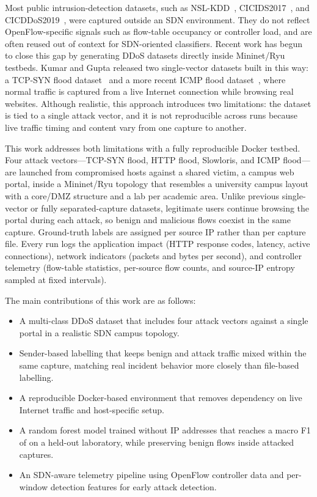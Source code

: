 \documentclass[lettersize,journal]{IEEEtran}
\begin{document}
Most public intrusion-detection datasets, such as NSL-KDD~\cite{tavallaee2009nslkdd}, CICIDS2017~\cite{sharafaldin2018cicflowmeter}, and CICDDoS2019~\cite{sharafaldin2019cicddos2019}, were captured outside an SDN environment. They do not reflect OpenFlow-specific signals such as flow-table occupancy or controller load, and are often reused out of context for SDN-oriented classifiers. Recent work has begun to close this gap by generating DDoS datasets directly inside Mininet/Ryu testbeds. Kumar and Gupta released two single-vector datasets built in this way: a TCP-SYN flood dataset~\cite{kumar2025synflood} and a more recent ICMP flood dataset~\cite{kumar2026icmpfloodsdn}, where normal traffic is captured from a live Internet connection while browsing real websites. Although realistic, this approach introduces two limitations: the dataset is tied to a single attack vector, and it is not reproducible across runs because live traffic timing and content vary from one capture to another.

This work addresses both limitations with a fully reproducible Docker testbed. Four attack vectors---TCP-SYN flood, HTTP flood, Slowloris, and ICMP flood---are launched from compromised hosts against a shared victim, a campus web portal, inside a Mininet/Ryu topology that resembles a university campus layout with a core/DMZ structure and a lab per academic area. Unlike previous single-vector or fully separated-capture datasets, legitimate users continue browsing the portal during each attack, so benign and malicious flows coexist in the same capture. Ground-truth labels are assigned per source IP rather than per capture file. Every run logs the application impact (HTTP response codes, latency, active connections), network indicators (packets and bytes per second), and controller telemetry (flow-table statistics, per-source flow counts, and source-IP entropy sampled at fixed intervals).

The main contributions of this work are as follows:
\begin{itemize}[leftmargin=*]
    \item A multi-class DDoS dataset that includes four attack vectors against a single portal in a realistic SDN campus topology.
    \item Sender-based labelling that keeps benign and attack traffic mixed within the same capture, matching real incident behavior more closely than file-based labelling.
    \item A reproducible Docker-based environment that removes dependency on live Internet traffic and host-specific setup.
    \item A random forest model trained without IP addresses that reaches a macro F1 of \Fmacro on a held-out laboratory, while preserving benign flows inside attacked captures.
    \item An SDN-aware telemetry pipeline using OpenFlow controller data and per-window detection features for early attack detection.
\end{itemize}
\end{document}
